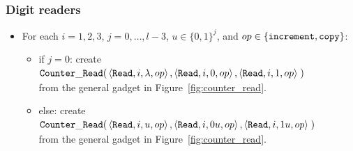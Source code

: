 \subsubsection{ Digit readers }

\begin{itemize}

\item For each $i = 1,2,3$,
               $j = 0,\ldots,l-3$,
               $u \in \{0, 1\}^j$, and
               $op \in \{{\tt increment}, {\tt copy} \}$:
    \begin{itemize}
        \item if $j = 0$:
        create
        $\begin{aligned}[t]
            {\tt Counter\_Read}(& \left\langle {\tt Read}, i, \lambda, op \right\rangle,
                       \left\langle {\tt Read}, i, 0, op \right\rangle,
                       \left\langle {\tt Read}, i, 1, op \right\rangle \;)
        \end{aligned}$\\ from the general gadget in Figure~\ref{fig:counter_read}.

        \item else:
        create
        $\begin{aligned}[t]
        {\tt Counter\_Read}(& \left\langle {\tt Read}, i, u,  op \right\rangle,
                   \left\langle {\tt Read}, i, 0u, op \right\rangle,
                   \left\langle {\tt Read}, i, 1u, op \right\rangle \;)
        \end{aligned}$\\ from the general gadget in Figure~\ref{fig:counter_read}.
    \end{itemize}

\end{itemize}

